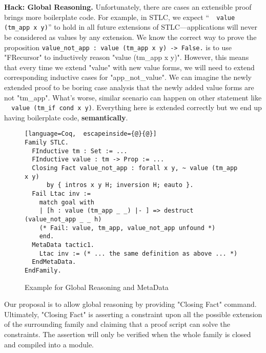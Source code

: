 
\textbf{Hack: Global Reasoning.}
Unfortunately, there are cases an extensible proof brings more boilerplate code. For example, in STLC, we expect
``\texttt{~ value (tm_app x y)}'' to hold in all future
extensions of STLC---applications will never be considered as values
by any extension.
We know the correct way to prove the proposition
\texttt{value_not_app : value (tm_app x y) -> False.} is to use
"FRecursor" to inductively reason "value (tm_app x y)". However, this
means that every time we extend "value" with new value forms, we will
need to extend corresponding inductive cases for "app_not_value". We can
imagine the newly extended proof to be boring case analysis that the
newly added value forms are not "tm_app". What's worse, similar
scenario can happen on other statement like \texttt{~ value
(tm_if cond x y)}. Everything here is extended correctly but we end up
having boilerplate code, \textbf{semantically}.
\begin{figure}[!htb]
\begin{lstlisting}[language=Coq,  escapeinside={@}{@}]
Family STLC.
  FInductive tm : Set := ... 
  FInductive value : tm -> Prop := ... 
  Closing Fact value_not_app : forall x y, ~ value (tm_app x y) 
      by { intros x y H; inversion H; eauto }.
  Fail Ltac inv := 
    match goal with 
    | [h : value (tm_app _ _) |- ] => destruct (value_not_app _ _ h)
    (* Fail: value, tm_app, value_not_app unfound *)
    end. 
  MetaData tactic1.
    Ltac inv := (* ... the same definition as above ... *)
  EndMetaData.
EndFamily.
\end{lstlisting}  
\caption{Example for Global Reasoning and MetaData}\label{fig:plugin-example-global-reasoning-meta-data}
\end{figure}


Our proposal is to allow global reasoning by providing "Closing Fact" command. Ultimately, "Closing Fact" is asserting a constraint upon all the
possible extension of the surrounding family and claiming that a proof script
can solve the constraints.
The assertion will only be verified when the whole family is closed and compiled into a module.

